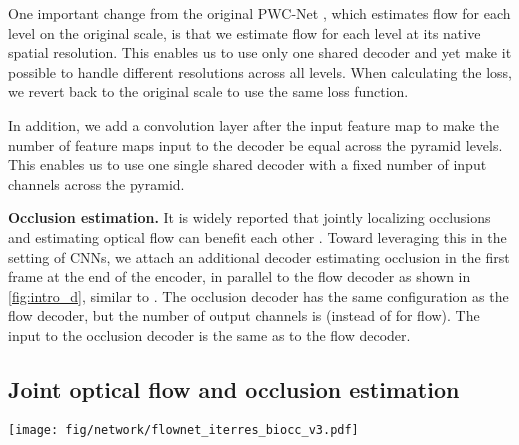 \documentclass[10pt,twocolumn,letterpaper]{article}
\newcommand{\myparagraph}[1]{\medbreak\noindent\textbf{#1}}
\begin{document}
\begin{figure*}[t]
One important change from the original PWC-Net \cite{Sun:2017:PWC}, which estimates flow for each level on the original scale, is that we estimate flow for each level at its native spatial resolution.
This enables us to use only one shared decoder and yet make it possible to handle different resolutions across all levels.
When calculating the loss, we revert back to the original scale to use the same loss function.

In addition, we add a  convolution layer after the input feature map  to make the number of feature maps input to the decoder  be equal across the pyramid levels. 
This enables us to use one single shared decoder with a fixed number of input channels across the pyramid.

\myparagraph{Occlusion estimation.}
It is widely reported that jointly localizing occlusions and estimating optical flow can benefit each other \cite{Alvarez:2007:SDO,Ballester:2012:ATL,Hur:2017:MFE,Ince:2008:OOF,Sun:2014:LLJ,Unger:2012:JME,Xiao:2006:BFO}.
Toward leveraging this in the setting of CNNs, we attach an additional decoder estimating occlusion  in the first frame at the end of the encoder, in parallel to the flow decoder as shown in \cref{fig:intro_d}, similar to \cite{Janai:2018:ULM, Neoral:2018:COO}. 
The occlusion decoder has the same configuration as the flow decoder, but the number of output channels is  (instead of  for flow). 
The input to the occlusion decoder is the same as to the flow decoder.

\subsection{Joint optical flow and occlusion estimation}

\begin{figure*}[t]
\centering
\begin{minipage}{0.73\textwidth}
	\centering
	\texttt{[image: fig/network/flownet\_iterres\_biocc\_v3.pdf]}
	\caption{\textbf{Joint optical flow and occlusion estimation: bi-directional estimation, bilateral refinement, and upsampling layer} (in the FlowNet setting): We estimate flow in both temporal directions and occlusion maps in both frames by switching the order of inputs to the decoder. Bilateral refinement and the upsampling layer further improve the accuracy of flow and occlusion. Modules with the same color share their weights.
	\Cf supplemental material for the corresponding PWC-Net variant.}
	\label{fig:flownet_iterres_biocc}	
\end{minipage} \quad 
\begin{minipage}{0.245\textwidth}
	\centering
	 \
    


\end{minipage}
\end{figure*}
\end{figure*}
\end{document}
